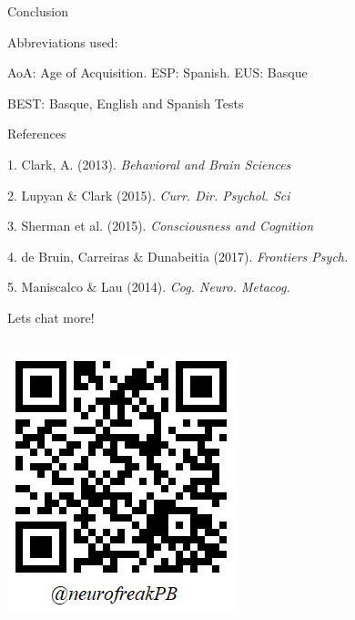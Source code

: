 \documentclass[final,12pt]{beamer}
\begin{document}
\begin{frame}[t]
\begin{columns}[t]
\begin{column}{\halfpagecol}
\begin{block}{Conclusion}
 \begin{greybox} {Abbreviations used:}
   \begin{description}
     \item \small AoA: Age of Acquisition. ESP: Spanish. EUS: Basque
     \item \small BEST: Basque, English and Spanish Tests
   \end{description}
   \end{greybox}
    
    \end{block}
    
    

    \begin{block}{References}
    \begin{description}
     \item \small1. Clark, A. (2013). \textit{Behavioral and Brain Sciences}
     \item \small2. Lupyan \& Clark (2015). \textit{Curr. Dir. Psychol. Sci}
     \item \small3. Sherman et al. (2015). \textit{Consciousness and Cognition}
      \item \small4. de Bruin, Carreiras \& Dunabeitia (2017). \textit{Frontiers Psych.}
     \item \small5. Maniscalco \& Lau (2014). \textit{Cog. Neuro. Metacog.}
    \end{description}
    \end{block}
    
        \vspace{-0.8em}

   
   
    \begin{bluebox}{{\small Lets chat more!}}
    \begin{columns}

\begin{column}{0.20\linewidth}
          \includegraphics[scale=0.5]{images/twitterqrcode}
          \centering
    \end{column}


\end{columns}
\end{bluebox}
\end{column}
\end{columns}
\end{frame}
\end{document}
